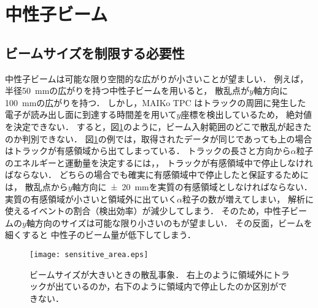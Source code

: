 \documentclass[../master]{subfiles}
\begin{document}
\section{中性子ビーム}
\subsection{ビームサイズを制限する必要性}
中性子ビームは可能な限り空間的な広がりが小さいことが望ましい．
例えば，半径\SI{50}{\milli\metre}の広がりを持つ中性子ビームを用いると，
散乱点が$y$軸方向に\SI{100}{\milli\metre}の広がりを持つ．
しかし，MAIKo TPC はトラックの周囲に発生した電子が読み出し面に到達する時間差を用いて$y$座標を検出しているため，
絶対値を決定できない．
すると，図\ref{fig::sensitive_area}のように，ビーム入射範囲のどこで散乱が起きたのか判別できない．
図\ref{fig::sensitive_area}の例では，取得されたデータが同じであっても上の場合はトラックが有感領域から出てしまっている．
トラックの長さと方向から$\alpha$粒子のエネルギーと運動量を決定するには，，
トラックが有感領域中で停止しなければならない．
どちらの場合でも確実に有感領域中で停止したと保証するためには，
散乱点から$y$軸方向に\SI{\pm20}{\milli\metre}を実質の有感領域としなければならない．
実質の有感領域が小さいと領域外に出ていく$\alpha$粒子の数が増えてしまい，
解析に使えるイベントの割合（検出効率）が減少してしまう．
そのため，中性子ビームの$y$軸方向のサイズは可能な限り小さいのもが望ましい．
その反面，ビームを細くすると
中性子のビーム量が低下してしまう．
\begin{figure}
  \centering
  \texttt{[image: sensitive\_area.eps]}
  \caption[ビームサイズが大きいときの散乱事象．]
          {ビームサイズが大きいときの散乱事象．
            右上のように領域外にトラックが出ているのか，右下のように領域内で停止したのか区別ができない．}
  \label{fig::sensitive_area}
\end{figure}
\end{document}
